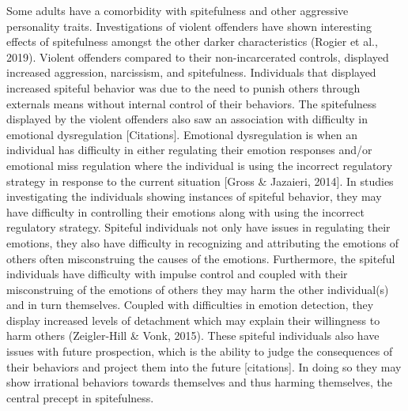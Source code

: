 \documentclass[
  english,
  donotrepeattitle,doc, 12pt, a4paper,floatsintext]{apa7}
\begin{document}
Some adults have a comorbidity with spitefulness and other aggressive personality traits. Investigations of violent offenders have shown interesting effects of spitefulness amongst the other darker characteristics (Rogier et al., 2019). Violent offenders compared to their non-incarcerated controls, displayed increased aggression, narcissism, and spitefulness. Individuals that displayed increased spiteful behavior was due to the need to punish others through externals means without internal control of their behaviors. The spitefulness displayed by the violent offenders also saw an association with difficulty in emotional dysregulation {[}Citations{]}. Emotional dysregulation is when an individual has difficulty in either regulating their emotion responses and/or emotional miss regulation where the individual is using the incorrect regulatory strategy in response to the current situation {[}Gross \& Jazaieri, 2014{]}. In studies investigating the individuals showing instances of spiteful behavior, they may have difficulty in controlling their emotions along with using the incorrect regulatory strategy. Spiteful individuals not only have issues in regulating their emotions, they also have difficulty in recognizing and attributing the emotions of others often misconstruing the causes of the emotions. Furthermore, the spiteful individuals have difficulty with impulse control and coupled with their misconstruing of the emotions of others they may harm the other individual(s) and in turn themselves. Coupled with difficulties in emotion detection, they display increased levels of detachment which may explain their willingness to harm others (Zeigler-Hill \& Vonk, 2015). These spiteful individuals also have issues with future prospection, which is the ability to judge the consequences of their behaviors and project them into the future {[}citations{]}. In doing so they may show irrational behaviors towards themselves and thus harming themselves, the central precept in spitefulness.\\
\end{document}
